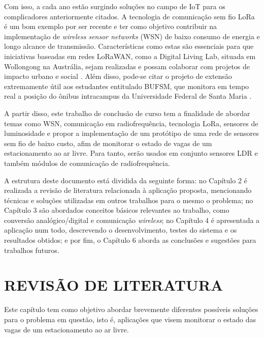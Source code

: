 \documentclass[oneside,openright,12pt]{ufsm_2015} %
\begin{document}
{Com isso, a cada ano estão surgindo soluções no campo de IoT para os complicadores anteriormente citados. A tecnologia de comunicação sem fio LoRa é um bom exemplo por ser recente e ter como objetivo contribuir na implementação de \textit{wireless sensor networks} (WSN) de baixo consumo de energia e longo alcance de transmissão. Características como estas são essenciais para que iniciativas baseadas em redes LoRaWAN, como a Digital Living Lab, situada em Wollongong na Austrália, sejam realizadas e possam colaborar com projetos de impacto urbano e social \cite{site:dll}. Além disso, pode-se citar o projeto de extensão extremamente útil aos estudantes entitulado BUFSM, que monitora em tempo real a posição do ônibus intracampus da Universidade Federal de Santa Maria \cite{bufsm-site}.

A partir disso, este trabalho de conclusão de curso tem a finalidade de abordar temas como WSN, comunicação em radiofrequência, tecnologia LoRa, sensores de luminosidade e propor a implementação de um protótipo de uma rede de sensores sem fio de baixo custo, afim de monitorar o estado de vagas de um estacionamento ao ar livre. Para tanto, serão usados em conjunto sensores LDR e também módulos de comunicação de radiofrequência.

A estrutura deste documento está dividida da seguinte forma: no Capítulo 2 é realizada a revisão de literatura relacionada à aplicação proposta, mencionando técnicas e soluções utilizadas em outros trabalhos para o mesmo o problema; no Capítulo 3 são abordados conceitos básicos relevantes ao trabalho, como conversão analógico/digital e comunicação \textit{wireless}; no Capítulo 4 é apresentada a aplicação num todo, descrevendo o desenvolvimento, testes do sistema e os resultados obtidos; e por fim, o Capítulo 6 aborda as conclusões e sugestões para trabalhos futuros.
}%
\geraintro  %
\chapter{REVISÃO DE LITERATURA}
Este capítulo tem como objetivo abordar brevemente diferentes possíveis soluções para o problema em questão, isto é, aplicações que visem monitorar o estado das vagas de um estacionamento ao ar livre.
\end{document}
